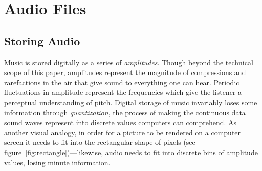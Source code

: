\section{Audio Files}

\subsection{Storing Audio}

Music is stored digitally as a series of \textit{amplitudes}. Though beyond the technical scope of this paper, amplitudes represent the magnitude of compressions and rarefactions in the air that give sound to everything one can hear. Periodic fluctuations in amplitude represent the frequencies which give the listener a perceptual understanding of pitch. Digital storage of music invariably loses some information through \textit{quantization}, the process of making the continuous data sound waves represent into discrete values computers can comprehend. As another visual analogy, in order for a picture to be rendered on a computer screen it needs to fit into the rectangular shape of pixels (see figure~\ref{fig:rectangle})---likewise, audio needs to fit into discrete bins of amplitude values, losing minute information.